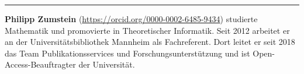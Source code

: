 \begin{center}\rule{0.5\linewidth}{0.5pt}\end{center}

\textbf{Philipp Zumstein} (\url{https://orcid.org/0000-0002-6485-9434})
studierte Mathematik und promovierte in Theoretischer Informatik. Seit
2012 arbeitet er an der Universitätsbibliothek Mannheim als
Fachreferent. Dort leitet er seit 2018 das Team Publikationsservices und
Forschungsunterstützung und ist Open-Access-Beauftragter der
Universität.
